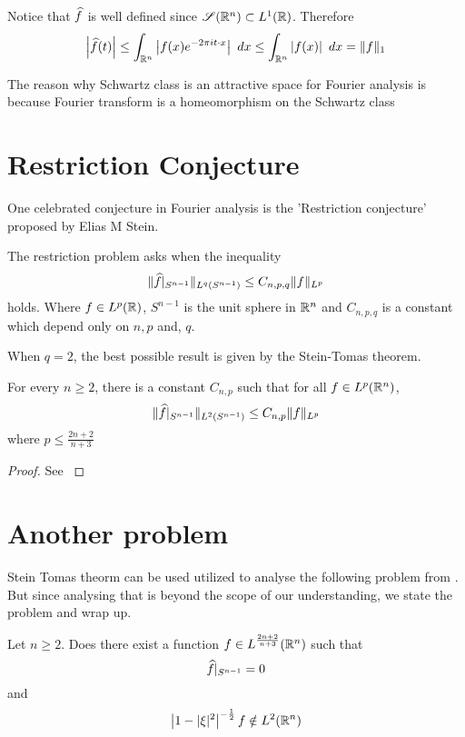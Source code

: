 Notice that $\widehat{f}$ is well defined since $\mathscr{S}(\mathbb R^n) \subset L^1(\mathbb R)$. Therefore $$\left|\hatf(t)\right| \le \int_{\R^n} \left|f(x) e^{-2\pi i t\cdot x}\right| \ dx \le \int_{\R^n} \left|f(x)\right| \ dx  = \|f\|_1$$

The reason why Schwartz class is an attractive space for Fourier analysis is because Fourier transform is a homeomorphism on the Schwartz class \autocite[Corollary 2.2.15]{Grafakos_Classical_Fourier}

\section{Restriction Conjecture}
One celebrated conjecture in Fourier analysis is the 'Restriction conjecture' proposed by Elias M Stein.

\begin{problem}
  The restriction problem asks when the inequality $$\|\widehat{f}\vert_{S^{n-1}}\|_{L^q(S^{n-1})} \le C_{n, p, q} \|f\|_{L^p}$$
holds. Where $f \in L^p(\mathbb R)$, $S^{n-1}$ is the unit sphere in $\mathbb R^n$ and $C_{n, p, q}$ is a constant which depend only on $n, p$ and, $q$.
\end{problem}

When $q=2$, the best possible result is given by the Stein-Tomas theorem.
\begin{theorem}
  For every $n\ge 2$, there is a constant $C_{n, p}$ such that for all $f \in L^p(\mathbb R^n)$, $$\|\widehat{f}\vert_{S^{n-1}}\|_{L^2(S^{n-1})} \le C_{n, p} \|f\|_{L^p}$$
  where $p\le \frac{2n+2}{n+3}$
\end{theorem}
\begin{proof}
  See \autocite[Theorem~11.1 \pno~288]{Schlag_classical_multilinear}
\end{proof}


\section{Another problem}
Stein Tomas theorm can be used utilized to analyse the following problem from \autocite[Problem.no~3]{Grafakos2017a}. But since analysing that is beyond the scope of our understanding, we state the problem and wrap up.

\begin{problem}
\label{prb:research_problem}
Let $n \ge 2$. Does there exist a function $f \in L^{\frac{2n+2}{n+3}}(\mathbb R^n)$ such that $$\widehat{f}\vert_{S^{n-1}} = 0$$
and
$$\left| 1 - |\xi|^2\right|^{-\frac{1}{2}}f \notin L^2(\mathbb R^n)$$
\end{problem}
